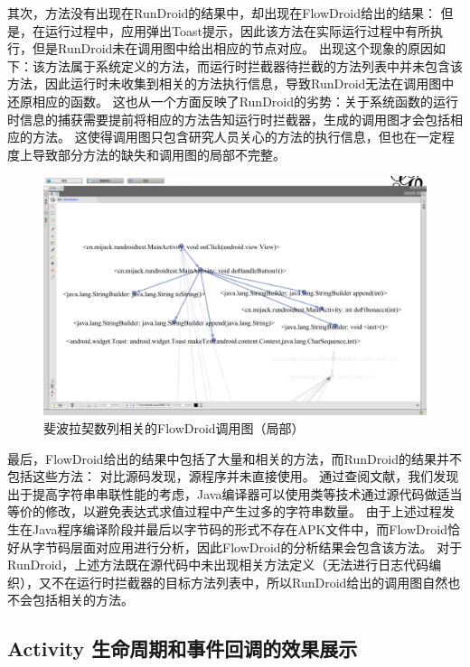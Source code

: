 其次，方法没有出现在RunDroid的结果中，却出现在FlowDroid给出的结果：
但是，在运行过程中，应用弹出Toast提示，因此该方法在实际运行过程中有所执行，但是RunDroid未在调用图中给出相应的节点对应。
出现这个现象的原因如下：该方法属于系统定义的方法，而运行时拦截器待拦截的方法列表中并未包含该方法，因此运行时未收集到相关的方法执行信息，导致RunDroid无法在调用图中还原相应的函数。
这也从一个方面反映了RunDroid的劣势：关于系统函数的运行时信息的捕获需要提前将相应的方法告知运行时拦截器，生成的调用图才会包括相应的方法。
这使得调用图只包含研究人员关心的方法的执行信息，但也在一定程度上导致部分方法的缺失和调用图的局部不完整。


\begin{figure}[!ht]
	\centering
	\includegraphics[width=\textwidth]{./Figures/FlowDroid-Fibonacci.png}
	\caption{斐波拉契数列相关的FlowDroid调用图（局部）}
	\label{fig:flowdroid-result-Fibonacci}
\end{figure}


最后，FlowDroid给出的结果中包括了大量和相关的方法，而RunDroid的结果并不包括这些方法：
对比源码发现，源程序并未直接使用。
通过查阅文献\cite{gosling2000java}，我们发现出于提高字符串串联性能的考虑，Java编译器可以使用类等技术通过源代码做适当等价的修改，以避免表达式求值过程中产生过多的字符串数量。
由于上述过程发生在Java程序编译阶段并最后以字节码的形式不存在APK文件中，而FlowDroid恰好从字节码层面对应用进行分析，因此FlowDroid的分析结果会包含该方法。
对于RunDroid，上述方法既在源代码中未出现相关方法定义（无法进行日志代码编织），又不在运行时拦截器的目标方法列表中，所以RunDroid给出的调用图自然也不会包括相关的方法。



\subsection{Activity 生命周期和事件回调的效果展示}

